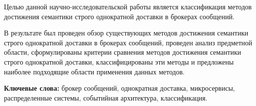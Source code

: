 
\begin{essay}{}

Целью данной научно-исследовательской работы является классификация методов достижения семантики строго однократной доставки в брокерах сообщений.

В результате был проведен обзор существующих методов достижения семантики строго однократной доставки в брокерах сообщений, проведен анализ предметной области, сформулированы критерии сравнения методов достижения семантики строго однократной доставки, классифицированы эти методы и предложены наиболее подходящие области применения данных методов.

\textbf{Ключевые слова:} брокер сообщений, однократная доставка, микросервисы, распределенные системы, событийная архитектура, классификация.

\end{essay}